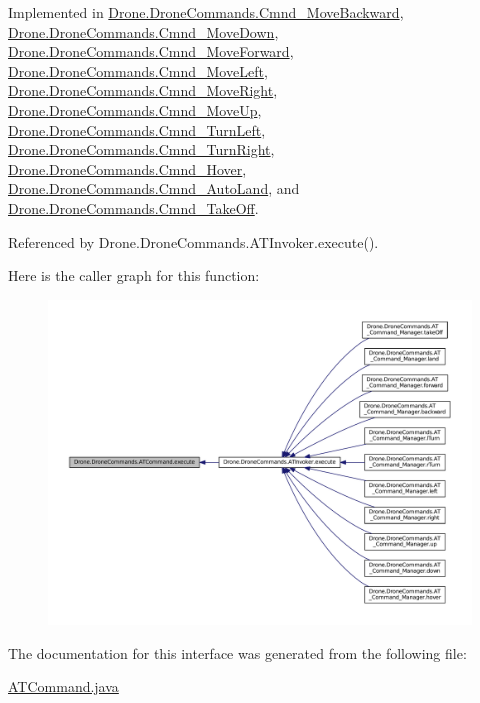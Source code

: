 Implemented in \hyperlink{class_drone_1_1_drone_commands_1_1_cmnd___move_backward_a4768346289e58b1bf2de05356af6c78a}{Drone.\+Drone\+Commands.\+Cmnd\+\_\+\+Move\+Backward}, \hyperlink{class_drone_1_1_drone_commands_1_1_cmnd___move_down_ae8cd059ba42c2e72ec8920c76b726884}{Drone.\+Drone\+Commands.\+Cmnd\+\_\+\+Move\+Down}, \hyperlink{class_drone_1_1_drone_commands_1_1_cmnd___move_forward_a7acdc81da70c5f42ff156b8bedec3a7b}{Drone.\+Drone\+Commands.\+Cmnd\+\_\+\+Move\+Forward}, \hyperlink{class_drone_1_1_drone_commands_1_1_cmnd___move_left_afdc1e84570cf60478378f67069e89182}{Drone.\+Drone\+Commands.\+Cmnd\+\_\+\+Move\+Left}, \hyperlink{class_drone_1_1_drone_commands_1_1_cmnd___move_right_aa7f5e79ac7f1c07cbff191f0f91d7219}{Drone.\+Drone\+Commands.\+Cmnd\+\_\+\+Move\+Right}, \hyperlink{class_drone_1_1_drone_commands_1_1_cmnd___move_up_acd81d9358005473be57b6bb615848bd4}{Drone.\+Drone\+Commands.\+Cmnd\+\_\+\+Move\+Up}, \hyperlink{class_drone_1_1_drone_commands_1_1_cmnd___turn_left_a584d6d5eb48dfaa91d5411eaf1205d5b}{Drone.\+Drone\+Commands.\+Cmnd\+\_\+\+Turn\+Left}, \hyperlink{class_drone_1_1_drone_commands_1_1_cmnd___turn_right_af819a07d889e2e667b36e9cf54bd0914}{Drone.\+Drone\+Commands.\+Cmnd\+\_\+\+Turn\+Right}, \hyperlink{class_drone_1_1_drone_commands_1_1_cmnd___hover_a420a0efbfd9a7872eac0cf8174b993bd}{Drone.\+Drone\+Commands.\+Cmnd\+\_\+\+Hover}, \hyperlink{class_drone_1_1_drone_commands_1_1_cmnd___auto_land_a1ecb7e3e22b76695af970b00fb043fb2}{Drone.\+Drone\+Commands.\+Cmnd\+\_\+\+Auto\+Land}, and \hyperlink{class_drone_1_1_drone_commands_1_1_cmnd___take_off_a53cd5804d2553dd77d31b1934ea546ac}{Drone.\+Drone\+Commands.\+Cmnd\+\_\+\+Take\+Off}.



Referenced by Drone.\+Drone\+Commands.\+A\+T\+Invoker.\+execute().



Here is the caller graph for this function\+:\nopagebreak
\begin{figure}[H]
\begin{center}
\leavevmode
\includegraphics[width=350pt]{interface_drone_1_1_drone_commands_1_1_a_t_command_a5205ae7a2269e1a82923c166322e1374_icgraph}
\end{center}
\end{figure}




The documentation for this interface was generated from the following file\+:\begin{DoxyCompactItemize}
\item 
\hyperlink{_a_t_command_8java}{A\+T\+Command.\+java}\end{DoxyCompactItemize}
